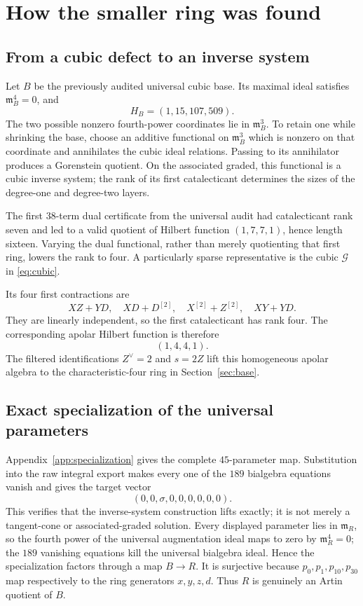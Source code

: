 \documentclass[11pt]{article}
\theoremstyle{remark}
\newcommand{\m}{\mathfrak m}
\begin{document}
\section{How the smaller ring was found}\label{sec:discovery}

\subsection{From a cubic defect to an inverse system}

Let \(B\) be the previously audited universal cubic base.  Its maximal ideal
satisfies \(\m_B^4=0\), and
\[
 H_B=(1,15,107,509).
\]
The two possible nonzero fourth-power coordinates lie in
\(\m_B^3\).  To retain one while shrinking the base, choose an additive
functional on \(\m_B^3\) which is nonzero on that coordinate and annihilates
the cubic ideal relations.  Passing to its annihilator produces a
Gorenstein quotient.  On the associated graded, this functional is a cubic
inverse system; the rank of its first catalecticant determines the sizes of
the degree-one and degree-two layers.

The first \(38\)-term dual certificate from the universal audit had
catalecticant rank seven and led to a valid quotient of Hilbert function
\((1,7,7,1)\), hence length sixteen.  Varying the dual functional, rather
than merely quotienting that first ring, lowers the rank to four.  A
particularly sparse representative is the cubic \(\mathcal G\) in
\eqref{eq:cubic}.

Its four first contractions are
\begin{equation}\label{eq:contractions}
 XZ+YD,\quad XD+D^{[2]},\quad
 X^{[2]}+Z^{[2]},\quad XY+YD.
\end{equation}
They are linearly independent, so the first catalecticant has rank four.
The corresponding apolar Hilbert function is therefore
\[
 (1,4,4,1).
\]
The filtered identifications \(Z^\vee=2\) and \(s=2Z\) lift this homogeneous
apolar algebra to the characteristic-four ring in Section~\ref{sec:base}.

\subsection{Exact specialization of the universal parameters}

Appendix~\ref{app:specialization} gives the complete \(45\)-parameter map.
Substitution into the raw integral export makes every one of the \(189\)
bialgebra equations vanish and gives the target vector
\[
 (0,0,\sigma,0,0,0,0,0,0).
\]
This verifies that the inverse-system construction lifts exactly; it is not
merely a tangent-cone or associated-graded solution.
Every displayed parameter lies in \(\m_R\), so the fourth power of the
universal augmentation ideal maps to zero by \(\m_R^4=0\); the \(189\)
vanishing equations kill the universal bialgebra ideal.  Hence the
specialization factors through a map \(B\to R\).  It is surjective because
\(p_0,p_1,p_{10},p_{30}\) map respectively to the ring generators
\(x,y,z,d\).  Thus \(R\) is genuinely an Artin quotient of \(B\).
\end{document}
